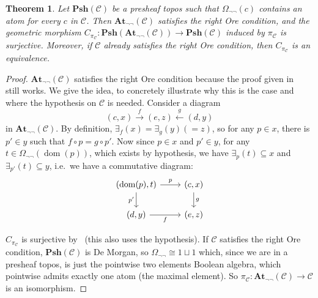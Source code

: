 \documentclass{article}
\newtheorem{theorem}{Theorem}
\newcommand{\At}{\mathbf{At}}
\newcommand{\Psh}{\mathbf{Psh}}
\newcommand{\dom}{{\operatorname{dom}}}
\begin{document}
\begin{theorem}
    Let $\Psh(\mathcal{C})$ be a presheaf topos such that $\Omega_{\neg\neg}(c)$ contains an atom for every $c$ in $\mathcal{C}$. Then $\At_{\neg\neg}(\mathcal{C})$ satisfies the right Ore condition, and the geometric morphism $C_{\pi_\mathcal{C}}:\Psh(\At_{\neg\neg}(\mathcal{C}))\to\Psh(\mathcal{C})$ induced by $\pi_\mathcal{C}$ is surjective. Moreover, if $\mathcal{C}$ already satisfies the right Ore condition, then $C_{\pi_\mathcal{C}}$ is an equivalence.
\end{theorem}
\begin{proof}
    $\At_{\neg\neg}(\mathcal{C})$ satisfies the right Ore condition because the proof given in~\cite[Remark 4.3]{johnstone1980gleason} still works. We give the idea, to concretely illustrate why this is the case and where the hypothesis on $\mathcal{C}$ is needed. 
    Consider a diagram 
    \[(c,x)\xrightarrow{f}(e,z)\xleftarrow{g}(d,y)\]
    in $\At_{\neg\neg}(\mathcal{C})$. By definition, $\exists_f(x)=\exists_g(y)(=z)$, so for any $p\in x$, there is $p'\in y$ such that $f\circ p=g\circ p'$. Now since $p\in x$ and $p'\in y$, for any $t\in\Omega_{\neg\neg}(\dom(p))$, which exists by hypothesis, we have $\exists_p(t)\subseteq x$ and $\exists_{p'}(t)\subseteq y$, i.e.~we have a commutative diagram:
    \[\begin{tikzcd}
        (\dom(p),t)\arrow[r,"p"]\arrow[d,"p'"'] & (c,x)\arrow[d,"g"]\\
        (d,y)\arrow[r,"f"'] & (e,z)
    \end{tikzcd}
    \]
    
    $C_{\pi_\mathcal{C}}$ is surjective by~\cite[Proposition 7.1]{caramello2019denseness} (this also uses the hypothesis). If $\mathcal{C}$ satisfies the right Ore condition, $\Psh(\mathcal{C})$ is De Morgan, so $\Omega_{\neg\neg}\cong 1\sqcup1$ which, since we are in a presheaf topos, is just the pointwise two elements Boolean algebra, which pointwise admits exactly one atom (the maximal element). So $\pi_\mathcal{C}:\At_{\neg\neg}(\mathcal{C})\to \mathcal{C} $ is an isomorphism.
\end{proof}
\end{document}
